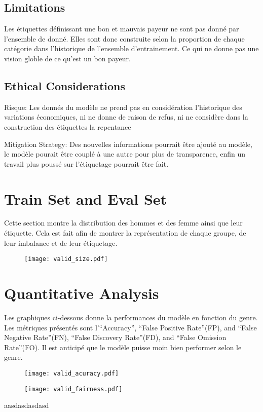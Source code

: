 \documentclass[8pt]{article}
\begin{document}
\subsection*{Limitations}
Les étiquettes définissant une bon et mauvais payeur ne sont pas donné par l'ensemble de donné. Elles sont donc construite selon la proportion de chaque catégorie dans l'historique de l'ensemble d'entrainement. Ce qui ne donne pas une vision globle de ce qu'est un bon payeur.

\subsection*{Ethical Considerations}

Risque: Les donnés du modèle ne prend pas en considération l'historique des variations économiques, ni ne donne de raison de refus, ni ne considère dans la construction des étiquettes la repentance

Mitigation Strategy: Des nouvelles informations pourrait être ajouté au modèle, le modèle pourait être couplé à une autre pour plus de transparence, enfin un travail plus poussé sur l'étiquetage pourrait être fait.

\section*{Train Set and Eval Set}
Cette section montre la distribution des hommes et des femme ainsi que leur étiquette. Cela est fait afin de montrer la représentation de chaque groupe, de leur imbalance et de leur étiquetage.

\begin{figure}[h]
\centering
\texttt{[image: valid\_size.pdf]}
\end{figure}

\section*{Quantitative Analysis}
Les graphiques ci-dessous donne la performances du modèle en fonction du genre. Les métriques présentés sont  l'“Accuracy”, “False Positive Rate”(FP), and “False Negative Rate”(FN), “False Discovery Rate”(FD), and “False Omission Rate”(FO). Il est anticipé que le modèle puisse moin bien performer selon le genre.

\begin{figure}[h]
\centering
\texttt{[image: valid\_acuracy.pdf]}
\end{figure}



\begin{figure}[h]
\centering
\texttt{[image: valid\_fairness.pdf]}
\end{figure}

aasdasdasdasd
\end{document}
